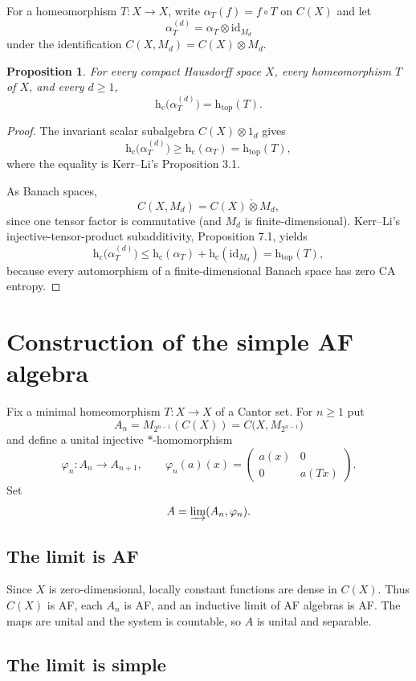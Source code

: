 \documentclass[11pt]{article}
\newtheorem{proposition}[theorem]{Proposition}
\theoremstyle{remark}
\newcommand{\hc}{\mathrm{h}_{\mathrm c}}
\newcommand{\htop}{\mathrm{h}_{\mathrm{top}}}
\newcommand{\id}{\mathrm{id}}
\newcommand{\injtensor}{\mathbin{\check\otimes}}
\begin{document}
For a homeomorphism $T\colon X\to X$, write
$\alpha_T(f)=f\circ T$ on $C(X)$ and let
\[
  \alpha_T^{(d)}=\alpha_T\otimes\id_{M_d}
\]
under the identification $C(X,M_d)=C(X)\otimes M_d$.

\begin{proposition}\label{prop:matrix-amplification}
For every compact Hausdorff space $X$, every homeomorphism $T$ of $X$, and
every $d\geq1$,
\[
  \hc\bigl(\alpha_T^{(d)}\bigr)=\htop(T).
\]
\end{proposition}

\begin{proof}
The invariant scalar subalgebra $C(X)\otimes 1_d$ gives
\[
  \hc\bigl(\alpha_T^{(d)}\bigr)
  \geq \hc(\alpha_T)=\htop(T),
\]
where the equality is Kerr--Li's Proposition 3.1.

As Banach spaces,
\[
  C(X,M_d)=C(X)\injtensor M_d,
\]
since one tensor factor is commutative (and $M_d$ is finite-dimensional).
Kerr--Li's injective-tensor-product subadditivity, Proposition 7.1, yields
\[
  \hc\bigl(\alpha_T^{(d)}\bigr)
  \leq \hc(\alpha_T)+\hc(\id_{M_d})
  =\htop(T),
\]
because every automorphism of a finite-dimensional Banach space has zero CA
entropy.
\end{proof}

\section{Construction of the simple AF algebra}

Fix a minimal homeomorphism $T\colon X\to X$ of a Cantor set.  For $n\geq1$
put
\[
  A_n=M_{2^{n-1}}(C(X))=C\bigl(X,M_{2^{n-1}}\bigr)
\]
and define a unital injective $*$-homomorphism
\[
  \varphi_n\colon A_n\longrightarrow A_{n+1},\qquad
  \varphi_n(a)(x)=
  \begin{pmatrix}
    a(x)&0\\
    0&a(Tx)
  \end{pmatrix}.
\]
Set
\[
  A=\varinjlim(A_n,\varphi_n).
\]

\subsection{The limit is AF}

Since $X$ is zero-dimensional, locally constant functions are dense in
$C(X)$.  Thus $C(X)$ is AF, each $A_n$ is AF, and an inductive limit of AF
algebras is AF.  The maps are unital and the system is countable, so $A$ is
unital and separable.

\subsection{The limit is simple}
\end{document}
